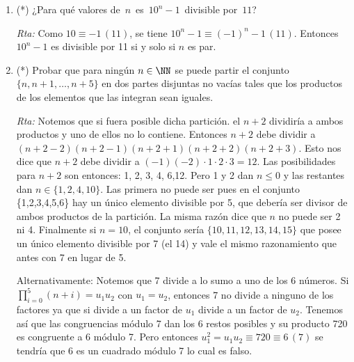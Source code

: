 \documentclass[12pt,spanish,makeidx]{amsbook}
\newcommand{\rta}{\noindent\textit{Rta: }}
\newcommand{\md}[1]{{\,}\left(#1\right)}
\begin{document}
\begin{enumerate}
	\rta Notemos que $1001=7\cdot11\cdot13$. Por lo tanto $(a, 1001) = 1$ implica $(a,7)=(a,11)=(a,13)=1$.
	Entonces $a^6\equiv1 \md{7}; a^{10}\equiv1 \md{11}$ y $ a^{12}\equiv1 \md{13}$.
	Por lo tanto $a^{720}=((a^6)^{10})^{12}\equiv 1 \md{7\cdot11\cdot13}$.
	
	\smallskip
	
	
	\
	
	
	\noindent (*): ejercicios opcionales de mayor dificultad.
	
	\smallskip
	
	\item (*) ¿Para qu\'e valores de \,$n$\, es \,$10^n-1$\, divisible por \,$11$?
	
	\rta Como $10\equiv -1 \md{11}$, se tiene $10^{n}-1\equiv(-1)^n-1 \md{11}$. Entonces $10^n-1$ es divisible por 11 si y solo si $n$ es par.
	
	\smallskip
	
	\item (*) Probar que para ningún $n\in\NN$ se puede partir el conjunto $\{n,n+1,\ldots, n+5\}$ en dos partes
	disjuntas no vacías tales que los productos de los elementos que las integran sean iguales.
	
	\rta Notemos que si fuera posible dicha partición. el $n+2$ dividiría a ambos productos y uno de ellos no lo contiene.
	Entonces $n+2$ debe dividir a $(n+2-2)(n+2-1)(n+2+1)(n+2+2)(n+2+3)$. Esto nos dice que $n+2$ debe dividir a 
	$(-1)(-2)\cdot1\cdot2\cdot3=12$. Las posibilidades para $n+2$ son entonces: 1, 2, 3, 4, 6,12.
	Pero 1 y 2 dan $n\le 0$ y las restantes dan $n\in \{1, 2, 4, 10\}$. Las primera no puede ser pues en el conjunto \{1,2,3,4,5,6\} hay un único elemento divisible por 5, que debería ser divisor de ambos productos de la partición.
	La misma razón dice que $n$ no puede ser 2 ni 4. Finalmente si $n=10$, el conjunto sería $\{10,11,12,13,14,15\}$ que posee un único elemento divisible por 7 (el 14) y vale el mismo razonamiento que antes con 7 en lugar de 5.
	
	Alternativamente: Notemos que 7 divide a lo sumo a uno de los 6 números. Si $\prod_{i=0}^5(n+i)=u_1u_2$ con $u_1=u_2$, entonces 7 no divide a ninguno de los factores ya que si divide a un factor de $u_1$ divide a un factor de $u_2$. Tenemos así que las congruencias módulo 7 dan los 6 restos posibles y su producto 720 es congruente a 6 módulo 7. Pero entonces $u_1^2=u_1u_2\equiv 720\equiv 6 \md{7}$ se tendría que 6 es un cuadrado módulo 7 lo cual es falso.
	
	\smallskip
	

\end{enumerate}
\end{document}
